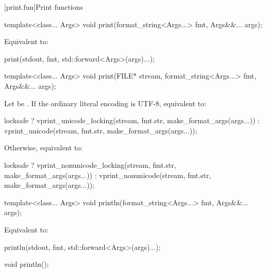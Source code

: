 [print.fun]{Print functions}

%
\begin{itemdecl}
template<class... Args>
  void print(format_string<Args...> fmt, Args&&... args);
\end{itemdecl}

\begin{itemdescr}
\pnum
\effects
Equivalent to:
\begin{codeblock}
print(stdout, fmt, std::forward<Args>(args)...);
\end{codeblock}
\end{itemdescr}

%
\begin{itemdecl}
template<class... Args>
  void print(FILE* stream, format_string<Args...> fmt, Args&&... args);
\end{itemdecl}

\begin{itemdescr}
\pnum
\effects
Let  be
.
If the ordinary literal encoding is UTF-8, equivalent to:
\begin{codeblock}
locksafe
  ? vprint_unicode_locking(stream, fmt.str, make_format_args(args...))
  : vprint_unicode(stream, fmt.str, make_format_args(args...));
\end{codeblock}
Otherwise, equivalent to:
\begin{codeblock}
locksafe
  ? vprint_nonunicode_locking(stream, fmt.str, make_format_args(args...))
  : vprint_nonunicode(stream, fmt.str, make_format_args(args...));
\end{codeblock}
\end{itemdescr}

%
\begin{itemdecl}
template<class... Args>
  void println(format_string<Args...> fmt, Args&&... args);
\end{itemdecl}

\begin{itemdescr}
\pnum
\effects
Equivalent to:
\begin{codeblock}
println(stdout, fmt, std::forward<Args>(args)...);
\end{codeblock}
\end{itemdescr}

%
\begin{itemdecl}
void println();
\end{itemdecl}

